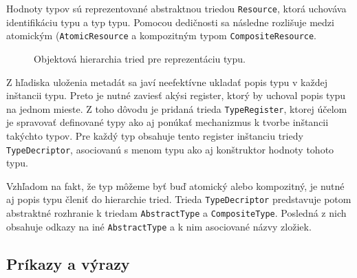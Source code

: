 Hodnoty typov sú reprezentované abstraktnou triedou \texttt{Resource}, ktorá uchováva identifikáciu typu a typ typu. Pomocou dedičnosti sa následne rozlišuje medzi atomickým (\texttt{AtomicResource} a kompozitným typom \texttt{CompositeResource}.

\begin{figure}[ht]
\caption{Objektová hierarchia tried pre reprezentáciu typu.}
\centering
{}
\end{figure}



Z hľadiska uloženia metadát sa javí neefektívne ukladať popis typu v každej inštancii typu. Preto je nutné zaviesť akýsi register, ktorý by uchoval popis typu na jednom mieste. Z toho dôvodu je pridaná trieda \texttt{TypeRegister}, ktorej účelom je spravovať definované typy ako aj ponúkať mechanizmus k tvorbe inštancii takýchto typov. 
Pre každý typ obsahuje tento register inštanciu triedy \texttt{TypeDecriptor}, asociovanú s menom typu ako aj konštruktor hodnoty tohoto typu. 


Vzhľadom na fakt, že typ môžeme byť buď atomický alebo kompozitný, je nutné aj popis typu členiť do hierarchie tried. Trieda \texttt{TypeDecriptor} predstavuje potom abstraktné rozhranie k triedam \texttt{AbstractType} a \texttt{CompositeType}. Posledná z nich obsahuje odkazy na iné \texttt{AbstractType} a k nim asociované názvy zložiek.


\subsection{Príkazy a výrazy}

